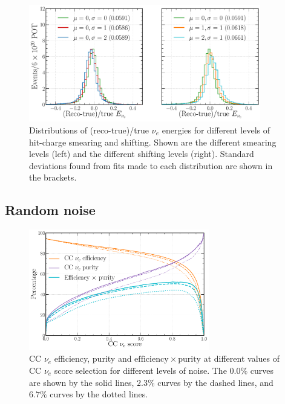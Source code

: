 \begin{figure} %
    \includegraphics[width=0.9\textwidth]{diagrams/7-results/calib_charge_abs_energy.pdf}
    \caption[Distributions of (reco-true)/true $\nu_{e}$ energies for different levels of hit-charge smearing and shifting]
    {Distributions of (reco-true)/true $\nu_{e}$ energies for different levels of hit-charge
        smearing and shifting. Shown are the different smearing levels (left) and the different
        shifting levels (right). Standard deviations found from fits made to each distribution are
        shown in the brackets.}
    \label{fig:calib_charge_abs_energy}
\end{figure}

\subsection*{Random noise} %

\begin{figure} %
    \includegraphics[width=0.7\textwidth]{diagrams/7-results/calib_noise_nuel_eff_curves.pdf}
    \caption[CC $\nu_{e}$ efficiency and purity curves for different levels of noise]
    {CC $\nu_{e}$ efficiency, purity and $\mathrm{efficiency}\times\mathrm{purity}$ at different
        values of CC $\nu_{e}$ score selection for different levels of noise. The $0.0\%$ curves are
        shown by the solid lines, $2.3\%$ curves by the dashed lines, and $6.7\%$ curves by the dotted
        lines.}
    \label{fig:calib_noise_nuel_eff_curves}
\end{figure}

